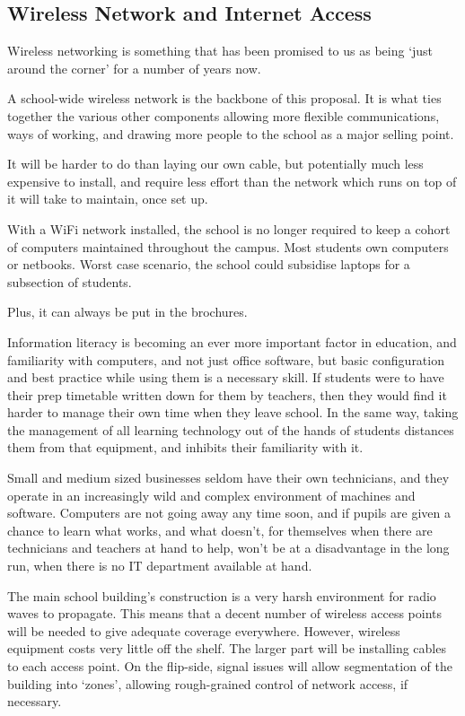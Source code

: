 \documentclass[a4paper,leqno,titlepage]{article}
\begin{document}
\subsection{Wireless Network and Internet Access}


Wireless networking is something that has been promised to us as being `just
around the corner' for a number of years now.


A school-wide wireless network is the backbone of this proposal. It is
what ties together the various other components allowing more flexible
communications, ways of working, and drawing more people to the school as a
major selling point.


It will be harder to do than laying our own cable, but potentially much less
expensive to install, and require less effort than the network which runs
on top of it will take to maintain, once set up.


With a WiFi network installed, the school is no longer required to keep a cohort
of computers maintained throughout the campus. Most students own computers
or netbooks. Worst case scenario, the school could subsidise laptops for a
subsection of students.


Plus, it can always be put in the brochures.


Information literacy is becoming an ever more important factor in education,
and familiarity with computers, and not just office software, but basic
configuration and best practice while using them is a necessary skill.
If students were to have their prep timetable written down for them by teachers,
then they would find it harder to manage their own time when they leave school.
In the same way, taking the management of all learning technology out of the
hands of students distances them from that equipment, and inhibits their
familiarity with it.

Small and medium sized businesses seldom have their own
technicians, and they operate in an increasingly wild and complex environment
of machines and software.
Computers are not going away any time soon, and if pupils
are given a chance to learn what works, and what doesn't, for themselves when
there are technicians and teachers at hand to help,
won't be at a disadvantage in the long run, when there is no IT department
available at hand.

The main school building's construction is a very harsh environment for radio
waves to propagate. This means that a decent number of wireless access points
will be needed to give adequate coverage everywhere. However, wireless equipment
costs very little off the shelf. The larger part will be installing cables
to each access point. On the flip-side, signal issues will allow segmentation
of the building into `zones', allowing rough-grained control of
network access, if necessary.
\end{document}
